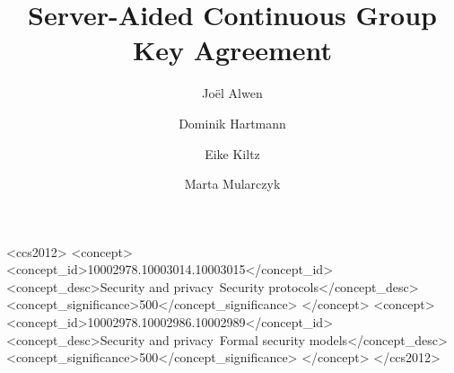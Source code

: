 \documentclass[sigconf]{acmart}
\begin{document}
\title{Server-Aided Continuous Group Key Agreement}

\author{Joël Alwen}
\author{Dominik Hartmann}
\author{Eike Kiltz}
\author{Marta Mularczyk}
  
\renewcommand{\shortauthors}{Joël Alwen, Dominik Hartmann, Eike Kiltz, \& Marta Mularczyk}

\begin{abstract}

\end{abstract}

\begin{CCSXML}
<ccs2012>
   <concept>
       <concept_id>10002978.10003014.10003015</concept_id>
       <concept_desc>Security and privacy~Security protocols</concept_desc>
       <concept_significance>500</concept_significance>
       </concept>
   <concept>
       <concept_id>10002978.10002986.10002989</concept_id>
       <concept_desc>Security and privacy~Formal security models</concept_desc>
       <concept_significance>500</concept_significance>
       </concept>
 </ccs2012>
\end{CCSXML}



\maketitle









\end{document}
